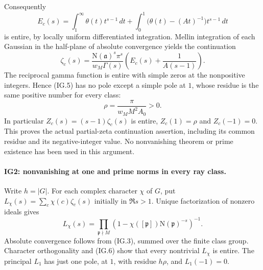 Consequently
\[
 E_c(s)=\int_1^\infty\theta(t)t^{s-1}\,dt
       +\int_0^1\bigl(\theta(t)-(At)^{-1}\bigr)t^{s-1}\,dt
\]
is entire, by locally uniform differentiated integration.
Mellin integration of each Gaussian in the half-plane of absolute
convergence yields the continuation
\[
 \zeta_c(s)=
  \frac{\mathrm N(\mathfrak a)^s\pi^s}{w_M\Gamma(s)}
          \left(E_c(s)+\frac1{A(s-1)}\right).           \tag{IG.5}
\]
The reciprocal gamma function is entire with simple zeros at the
nonpositive integers. Hence (IG.5) has no pole except a simple
pole at $1$, whose residue is the same positive number for every
class:
\[
          \rho=\frac{\pi}{w_M M^2 A_0}>0.
                                                               \tag{IG.6}
\]
In particular $Z_c(s)=(s-1)\zeta_c(s)$ is entire,
$Z_c(1)=\rho$ and $Z_c(-1)=0$. This proves the actual partial-zeta
continuation assertion, including its common residue and its
negative-integer value. No nonvanishing theorem or prime existence
has been used in this argument.

\paragraph{IG2: nonvanishing at one and prime norms in every ray class.}
Write $h=|G|$. For each complex character $\chi$ of $G$, put
$L_\chi(s)=\sum_c\chi(c)\zeta_c(s)$ initially in $\Re s>1$.
Unique factorization of nonzero ideals gives
\[
 L_\chi(s)=\prod_{\mathfrak p\nmid M}
       (1-\chi([\mathfrak p])\mathrm N(\mathfrak p)^{-s})^{-1}.
                                                               \tag{IG.7}
\]
Absolute convergence follows from (IG.3), summed over the finite
class group. Character orthogonality and (IG.6) show that every
nontrivial $L_\chi$ is entire. The principal $L_1$ has just one
pole, at $1$, with residue $h\rho$, and $L_1(-1)=0$.

